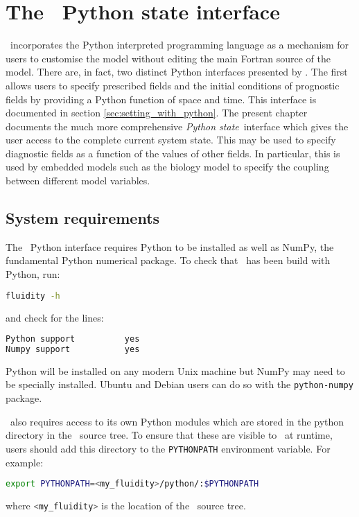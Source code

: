 \chapter{The \fluidity\ Python state interface}\label{chap:python}

\fluidity\ incorporates the Python interpreted programming language as a
mechanism for users to customise the model without editing the main Fortran
source of the model. There are, in fact, two distinct Python interfaces
presented by \fluidity. The first allows users to specify prescribed fields
and the initial conditions of prognostic fields by providing a Python
function of space and time. This interface is documented in section
\ref{sec:setting_with_python}. The present chapter documents the much more
comprehensive \emph{Python state}\ interface which gives the user access to
the complete current system state. This may be used to specify diagnostic
fields as a function of the values of other fields. In particular, this is
used by embedded models such as the biology model to specify the coupling
between different model variables.

\section{System requirements}

The \fluidity\ Python interface requires Python to be installed as well as
NumPy, the fundamental Python numerical package. To check that \fluidity\
has been build with Python, run:
\begin{lstlisting}[language=Bash]
  fluidity -h
\end{lstlisting}
and check for the lines:
\begin{lstlisting}[language=Bash]
Python support			yes
Numpy support			yes
\end{lstlisting}
Python will be installed on any modern Unix machine but NumPy may need to be
specially installed. Ubuntu and Debian users can do so with the
\lstinline[language=Bash]+python-numpy+ package.

\fluidity\ also requires access to its own Python modules which are stored in
the python directory in the \fluidity\ source tree. To ensure that these are
visible to \fluidity\ at runtime, users should add this directory to the
\lstinline[language=Bash]+PYTHONPATH+ environment variable. For example:\
\begin{lstlisting}[language=Bash]
export PYTHONPATH=<my_fluidity>/python/:$PYTHONPATH
\end{lstlisting}%
where \lstinline[language=Bash]+<my_fluidity>+ is the location of the
\fluidity\ source tree.

